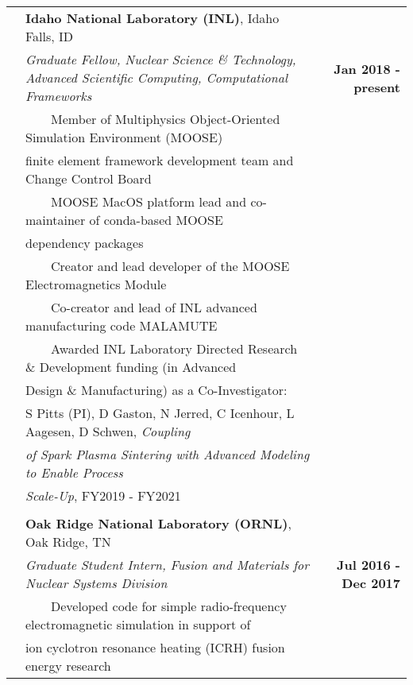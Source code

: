 \documentclass{article}
\newcommand{\tabitem}{~~\textbullet~~}
\begin{document}
\begin{tabularx}{\textwidth}{l X r}
	\hspace{2em} & \textbf{Idaho National Laboratory (INL)}, Idaho Falls, ID & \\
	& \textit{Graduate Fellow, Nuclear Science \& Technology, Advanced Scientific Computing, Computational Frameworks} & \textbf{Jan 2018 - present} \\
	& \tabitem Member of Multiphysics Object-Oriented Simulation Environment (MOOSE) & \\
	& \hspace{1.5em} finite element framework development team and Change Control Board & \\
  & \tabitem MOOSE MacOS platform lead and co-maintainer of conda-based MOOSE & \\
    & \hspace{1.5em} dependency packages & \\
	& \tabitem Creator and lead developer of the MOOSE Electromagnetics Module & \\
	& \tabitem Co-creator and lead of INL advanced manufacturing code MALAMUTE & \\
	& \tabitem Awarded INL Laboratory Directed Research \& Development funding (in Advanced & \\
	& \hspace{1.5em} Design \& Manufacturing) as a Co-Investigator: & \\
	& \hspace{2.5em} S Pitts (PI), D Gaston, N Jerred, C Icenhour, L Aagesen, D Schwen, \textit{Coupling} & \\
	& \hspace{2.5em} \textit{of Spark Plasma Sintering with Advanced Modeling to Enable Process} & \\
	& \hspace{2.5em} \textit{Scale-Up}, FY2019 - FY2021 & \\
	& & \\
	& \textbf{Oak Ridge National Laboratory (ORNL)}, Oak Ridge, TN & \\
	& \textit{Graduate Student Intern, Fusion and Materials for Nuclear Systems Division} & \textbf{Jul 2016 - Dec 2017} \\
	& \tabitem Developed code for simple radio-frequency electromagnetic simulation in support of & \\
	& \hspace{1.5em} ion cyclotron resonance heating (ICRH) fusion energy research & \\

\end{tabularx}
\end{document}
